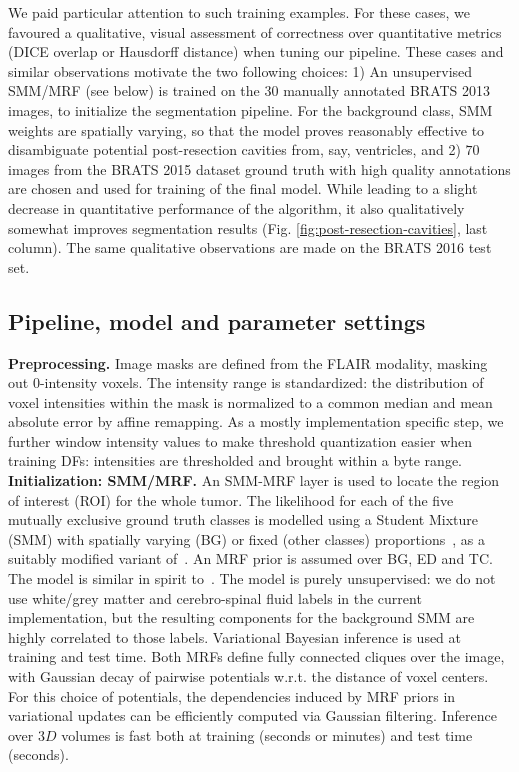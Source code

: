 We paid particular attention to such training examples. For these cases, we favoured a qualitative, visual 
assessment of correctness over quantitative metrics (DICE overlap or Hausdorff distance) when tuning our pipeline. 
These cases and similar observations motivate the two following choices: 1) An unsupervised SMM/MRF (see below) is trained on the $30$ manually annotated BRATS 2013 images, to initialize the segmentation pipeline. For the background class, SMM weights are spatially varying, so that the model proves reasonably effective to disambiguate potential post-resection cavities from, say, ventricles, and 2) $70$ images from the BRATS 2015 dataset ground truth with high quality annotations are chosen and used for training of the final model. While leading to a slight decrease in quantitative performance of the algorithm, it also qualitatively somewhat improves segmentation results (Fig. \ref{fig:post-resection-cavities}, last column). The same qualitative observations are made on the BRATS 2016 test set. 

\subsection{Pipeline, model and parameter settings}

\noindent
\textbf{Preprocessing.} Image masks are defined from the FLAIR modality, masking out $0$-intensity voxels. The intensity range is standardized: the distribution of voxel intensities within the mask is normalized to a common median and mean absolute error by affine remapping. As a mostly implementation specific step, we further window intensity values to make threshold quantization easier when training DFs: intensities are thresholded and brought within a byte range.\\

\noindent
\textbf{Initialization: SMM/MRF.} An SMM-MRF layer is used to locate the region of interest (ROI) for the whole tumor. The likelihood for each of the five mutually exclusive ground truth classes is modelled using a Student Mixture (SMM) with spatially varying (BG) or fixed (other classes) proportions~\cite{archambeau2007robust}, as a suitably modified variant of~\cite{cordier2015patch}. An MRF prior is assumed over BG, ED and TC. The model is similar in spirit to~\cite{zhang2001segmentation,menze2010generative}. The model is purely unsupervised: we do not use white/grey matter and cerebro-spinal fluid labels in the current implementation, but the resulting components for the background SMM are highly correlated to those labels. %
Variational Bayesian inference is used at training and test time. Both MRFs define fully connected cliques over the image, with Gaussian decay of pairwise potentials w.r.t. the distance of voxel centers. For this choice of potentials, the dependencies induced by MRF priors in variational updates can be efficiently computed via Gaussian filtering. Inference over $3D$ volumes is fast both at training (seconds or minutes) and test time (seconds).\\

